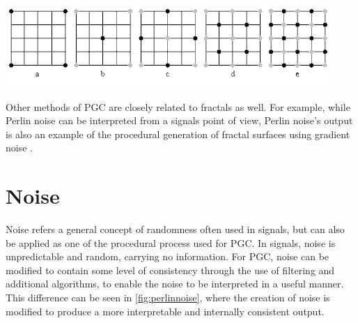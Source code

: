 \documentclass[10pt]{report}
\begin{document}
			\begin{minipage}{\textwidth}
				\centering
				\includegraphics[scale=1.0]{diamond_square}
				\label{fig:diamond_square}
			\end{minipage}
			
			Other methods of PGC are closely related to fractals as well. For example, while Perlin noise can be interpreted from a signals point of view, Perlin noise's output is also an example of the procedural generation of fractal surfaces using gradient noise \cite{fractal-landscapes}.
		
		\section{Noise}
			Noise refers a general concept of randomness often used in signals, but can also be applied as one of the procedural process used for PGC. In signals, noise is unpredictable and random, carrying no information. For PGC, noise can be modified to contain some level of consistency through the use of filtering and additional algorithms, to enable the noise to be interpreted in a useful manner. This difference can be seen in \autoref{fig:perlinnoise}, where the creation of noise is modified to produce a more interpretable and internally consistent output. 
			
\end{document}

